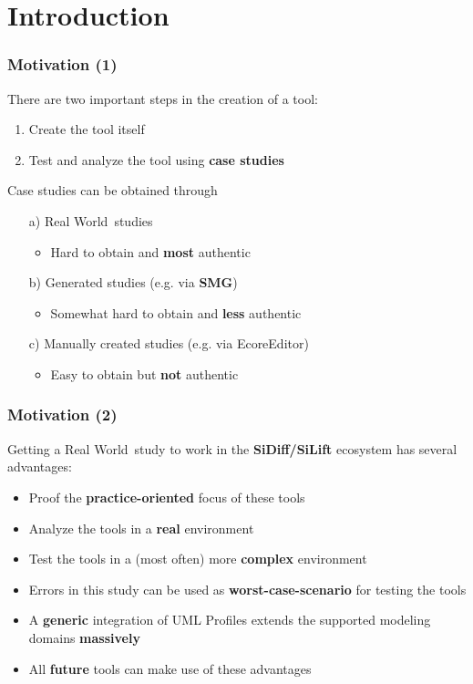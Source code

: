 \documentclass[10pt]{beamer}
\begin{document}
\section{Introduction}
\begin{frame}
\frametitle{Motivation (1)}
There are two important steps in the creation of a tool:
\begin{enumerate}
  \item Create the tool itself
  \item Test and analyze the tool using \textbf{case studies}
\end{enumerate}
\medskip
Case studies can be obtained through 
\begin{enumerate}
  \item[a)] \glqq Real World\grqq\ studies 
  \begin{itemize}
\item Hard to obtain and \textbf{most} authentic
  \end{itemize}
  \item[b)] Generated studies (e.g. via \textbf{SMG})
  \begin{itemize}
\item Somewhat hard to obtain and \textbf{less} authentic
  \end{itemize}
   \item[c)] Manually created studies (e.g. via EcoreEditor)
  \begin{itemize}
\item Easy to obtain but \textbf{not} authentic
  \end{itemize}
\end{enumerate}
\end{frame}
\begin{frame}
\frametitle{Motivation (2)}
Getting a \glqq Real World\grqq\ study to work in the \textbf{SiDiff/SiLift} ecosystem has several advantages:
\begin{itemize}
  \item Proof the \textbf{practice-oriented} focus of these tools
  \item Analyze the tools in a \textbf{real} environment
  \item Test the tools in a (most often) more \textbf{complex} environment
  \item Errors in this study can be used as \textbf{worst-case-scenario}
  for testing the tools
  \item A \textbf{generic} integration of UML Profiles extends the supported
  modeling domains \textbf{massively}
  \item All \textbf{future} tools can make use of these advantages
\end{itemize}
\end{frame}
\end{document}
